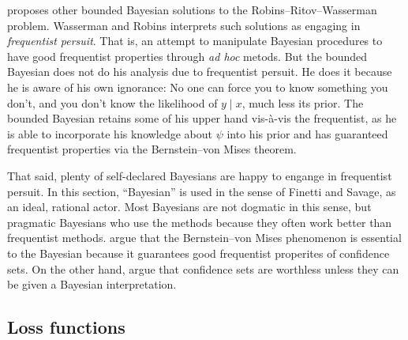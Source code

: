\cite{Sims2012-ze} proposes other bounded Bayesian solutions
to the Robins--Ritov--Wasserman problem. Wasserman and Robins interprets
such solutions as engaging in \emph{frequentist persuit}. That is,
an attempt to manipulate Bayesian procedures to have good frequentist
properties through \emph{ad hoc} metods. But the bounded Bayesian
does not do his analysis due to frequentist persuit. He does it because
he is aware of his own ignorance: No one can force you to know something
you don't, and you don't know the likelihood of $y\mid x$, much less
its prior. The bounded Bayesian retains some of his upper hand vis-à-vis
the frequentist, as he is able to incorporate his knowledge about
$\psi$ into his prior and has guaranteed frequentist properties via
the Bernstein--von Mises theorem.

That said, plenty of self-declared Bayesians are happy to engange
in frequentist persuit. In this section, ``Bayesian'' is used in
the sense of Finetti and Savage, as an ideal, rational actor. Most
Bayesians are not dogmatic in this sense, but pragmatic Bayesians
who use the methods because they often work better than frequentist
methods. \cite{Gelman2013-ib} argue that the Bernstein--von Mises
phenomenon is essential to the Bayesian because it guarantees good
frequentist properites of confidence sets. On the other hand, \cite{Morey2016-ry}
argue that confidence sets are worthless unless they can be given
a Bayesian interpretation. 

\subsection{Loss functions}

